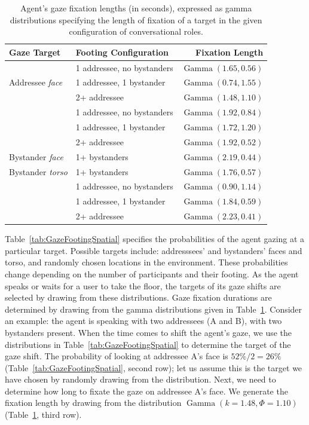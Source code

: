 \begin{table}
\centering
\def\arraystretch{1.5}
\begin{tabular}{|l|l|r|}
\hline
\textbf{Gaze Target} & \textbf{Footing Configuration} & \textbf{Fixation Length} \\
\hline
\multirow{3}{*}{Addressee \emph{face}} & 1 addressee, no bystanders & $\mathop{Gamma}(1.65, 0.56)$ \\
& 1 addressee, 1 bystander & $\mathop{Gamma}(0.74, 1.55)$ \\
& 2+ addressee & $\mathop{Gamma}(1.48, 1.10)$ \\
\hdashline
\multirow{3}{*}{Addressee \emph{torso}} & 1 addressee, no bystanders & $\mathop{Gamma}(1.92, 0.84)$ \\
& 1 addressee, 1 bystander & $\mathop{Gamma}(1.72, 1.20)$ \\
& 2+ addressee & $\mathop{Gamma}(1.92, 0.52)$ \\
\hdashline
Bystander \emph{face} & 1+ bystanders & $\mathop{Gamma}(2.19, 0.44)$ \\
\hdashline
Bystander \emph{torso} & 1+ bystanders & $\mathop{Gamma}(1.76, 0.57)$ \\
\hdashline
\multirow{3}{*}{Environment} & 1 addressee, no bystanders & $\mathop{Gamma}(0.90, 1.14)$ \\
& 1 addressee, 1 bystander & $\mathop{Gamma}(1.84, 0.59)$ \\
& 2+ addressee & $\mathop{Gamma}(2.23, 0.41)$ \\
\hline
\end{tabular}
\caption{Agent's gaze fixation lengths (in seconds), expressed as gamma distributions specifying the length of fixation of a target in the given configuration of conversational roles.}
\label{tab:GazeFootingFixationLengths}
\end{table}

Table~\ref{tab:GazeFootingSpatial} specifies the probabilities of the agent gazing at a particular target. Possible targets include: addresssees' and bystanders' faces and torso, and randomly chosen locations in the environment. These probabilities change depending on the number of participants and their footing. As the agent speaks or waits for a user to take the floor, the targets of its gaze shifts are selected by drawing from these distributions. Gaze fixation durations are determined by drawing from the gamma distributions given in Table~\ref{tab:GazeFootingFixationLengths}. Consider an example: the agent is speaking with two addressees (A and B), with two bystanders present. When the time comes to shift the agent's gaze, we use the distributions in Table~\ref{tab:GazeFootingSpatial} to determine the target of the gaze shift. The probability of looking at addressee A's face is $52\% / 2 = 26\%$ (Table~\ref{tab:GazeFootingSpatial}, second row); let us assume this is the target we have chosen by randomly drawing from the distribution. Next, we need to determine how long to fixate the gaze on addressee A's face. We generate the fixation length by drawing from the distribution $\mathop{Gamma}(k = 1.48, \Phi = 1.10)$ (Table~\ref{tab:GazeFootingFixationLengths}, third row).

